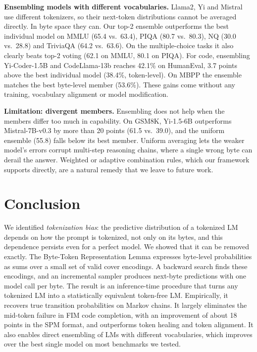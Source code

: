 \documentclass{article} %
\begin{document}
\textbf{Ensembling models with different vocabularies.} Llama2, Yi and Mistral use different tokenizers, so their next-token distributions cannot be averaged directly. In byte space they can. Our top-2 ensemble outperforms the best individual model on MMLU (65.4 vs.\ 63.4), PIQA (80.7 vs.\ 80.3), NQ (30.0 vs.\ 28.8) and TriviaQA (64.2 vs.\ 63.6). On the multiple-choice tasks it also clearly beats top-2 voting (62.1 on MMLU, 80.1 on PIQA). For code, ensembling Yi-Coder-1.5B and CodeLlama-13b reaches 42.1\% on HumanEval, 3.7 points above the best individual model (38.4\%, token-level). On MBPP the ensemble matches the best byte-level member (53.6\%). These gains come without any training, vocabulary alignment or model modification.

\textbf{Limitation: divergent members.} Ensembling does not help when the members differ too much in capability. On GSM8K, Yi-1.5-6B outperforms Mistral-7B-v0.3 by more than 20 points (61.5 vs.\ 39.0), and the uniform ensemble (55.8) falls below its best member. Uniform averaging lets the weaker model's errors corrupt multi-step reasoning chains, where a single wrong byte can derail the answer. Weighted or adaptive combination rules, which our framework supports directly, are a natural remedy that we leave to future work.

\section{Conclusion}
\label{sec:conclusion}
We identified \emph{tokenization bias}: the predictive distribution of a tokenized LM depends on how the prompt is tokenized, not only on its bytes, and this dependence persists even for a perfect model. We showed that it can be removed exactly. The Byte-Token Representation Lemma expresses byte-level probabilities as sums over a small set of valid cover encodings. A backward search finds these encodings, and an incremental sampler produces next-byte predictions with one model call per byte. The result is an inference-time procedure that turns any tokenized LM into a statistically equivalent token-free LM. Empirically, it recovers true transition probabilities on Markov chains. It largely eliminates the mid-token failure in FIM code completion, with an improvement of about 18 points in the SPM format, and outperforms token healing and token alignment. It also enables direct ensembling of LMs with different vocabularies, which improves over the best single model on most benchmarks we tested.
\end{document}
